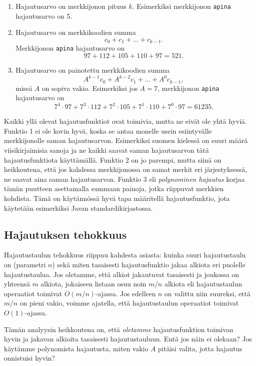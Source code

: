 \begin{enumerate}
\item Hajautusarvo on merkkijonon pituus $k$.
Esimerkiksi merkkijonon \texttt{apina} hajautusarvo on 5.
\item Hajautusarvo on merkkikoodien summa
\[ c_0 + c_1 + \dots + c_{k-1}.\]
Merkkijonon \texttt{apina} hajautusarvo on
\[97+112+105+110+97=521.\]
\item Hajautusarvo on painotettu merkkikoodien summa
\[ A^{k-1} c_0 + A^{k-2} c_1 + \dots + A^0 c_{k-1},\]
missä $A$ on sopiva vakio.
Esimerkiksi jos $A=7$, merkkijonon \texttt{apina} hajautusarvo on
\[7^4 \cdot 97+7^3 \cdot 112+7^2 \cdot 105+7^1 \cdot 110+7^0 \cdot 97=61235.\]
\end{enumerate}

Kaikki yllä olevat hajautusfunktiot ovat toimivia,
mutta ne eivät ole yhtä hyviä.
Funktio 1 ei ole kovin hyvä, koska se antaa monelle
usein esiintyvälle merkkijonolle saman hajautusarvon.
Esimerkiksi suomen kielessä on suuri määrä viisikirjaimisia
sanoja ja ne kaikki saavat saman hajautusarvon tätä
hajautusfunktiota käyttämällä.
Funktio 2 on jo parempi, mutta siinä on heikkoutena,
että jos kahdessa merkkijonossa on samat merkit eri
järjestyksessä, ne saavat aina saman hajautusarvon.
Funktio 3 eli \emph{polynominen hajautus} korjaa tämän puutteen
asettamalla summaan painoja, jotka riippuvat merkkien kohdista.
Tämä on käytännössä hyvä tapa määritellä hajautusfunktio,
jota käytetään esimerkiksi Javan standardikirjastossa.

\subsection{Hajautuksen tehokkuus}

Hajautustaulun tehokkuus riippuu kahdesta asiasta:
kuinka suuri hajautustaulu on (parametri $n$)
sekä miten tasaisesti hajautusfunktio jakaa alkiota
eri puolelle hajautustaulua.
Jos oletamme, että alkiot jakautuvat tasaisesti
ja joukossa on yhteensä $m$ alkiota,
jokaiseen listaan osuu noin $m/n$ alkiota
eli hajautustaulun operaatiot toimivat $O(m/n)$-ajassa.
Jos edelleen $n$ on valittu niin suureksi,
että $m/n$ on pieni vakio, voimme ajatella,
että hajautustaulun operaatiot toimivat $O(1)$-ajassa.

Tämän analyysin heikkoutena on, että \emph{oletamme}
hajautusfunktion toimivan hyvin ja jakavan alkioita
tasaisesti hajautustauluun. Entä jos näin ei olekaan?
Jos käytämme polynomista hajautusta, miten vakio $A$
pitäisi valita, jotta hajautus onnistuisi hyvin?

